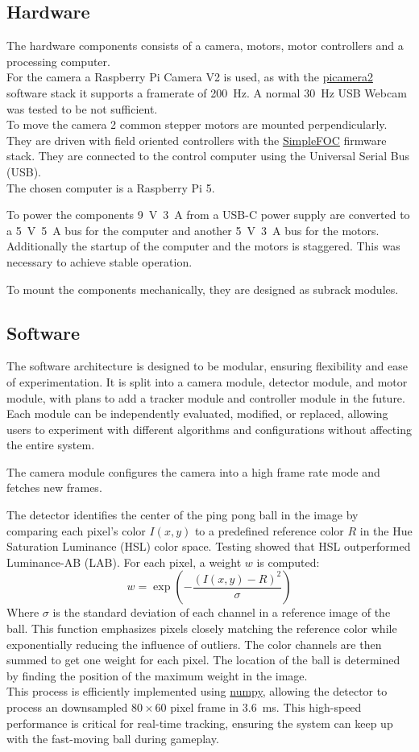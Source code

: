\documentclass[
    parskip=half, 
    twoside=false,
    twocolumn=true,
    fontsize=12pt,
]{scrarticle}
\begin{document}
\subsection*{Hardware}
The hardware components consists of a camera, motors, motor controllers and a processing computer.\\
For the camera a Raspberry Pi Camera V2 is used, as with the \href{https://github.com/raspberrypi/picamera2}{picamera2} software stack it supports a framerate of \SI{200}{Hz}.
A normal \SI{30}{Hz} USB Webcam was tested to be not sufficient.\\
To move the camera 2 common stepper motors are mounted perpendicularly.
They are driven with field oriented controllers with the \href{https://simplefoc.com/}{SimpleFOC} firmware stack.
They are connected to the control computer using the Universal Serial Bus (USB).\\
The chosen computer is a Raspberry Pi 5.

To power the components \SI{9}{V}~\SI{3}{A} from a USB-C power supply are converted to a \SI{5}{V}~\SI{5}{A} bus for the computer and another \SI{5}{V}~\SI{3}{A} bus for the motors.
Additionally the startup of the computer and the motors is staggered.
This was necessary to achieve stable operation.

To mount the components mechanically, they are designed as subrack modules.

\subsection*{Software}
The software architecture is designed to be modular, ensuring flexibility and ease of experimentation. It is split into a camera module, detector module, and motor module, with plans to add a tracker module and controller module in the future. Each module can be independently evaluated, modified, or replaced, allowing users to experiment with different algorithms and configurations without affecting the entire system.

The camera module configures the camera into a high frame rate mode and fetches new frames.

The detector identifies the center of the ping pong ball in the image by comparing each pixel's color $I(x,y)$ to a predefined reference color $R$ in the Hue Saturation Luminance (HSL) color space.
Testing showed that HSL outperformed Luminance-AB (LAB).
For each pixel, a weight $w$ is computed:
$$w = \exp\left(- \frac{(I(x,y)-R)^2}{\sigma}\right)$$
Where $\sigma$ is the standard deviation of each channel in a reference image of the ball.
This function emphasizes pixels closely matching the reference color while exponentially reducing the influence of outliers.
The color channels are then summed to get one weight for each pixel.
The location of the ball is determined by finding the position of the maximum weight in the image.\\
This process is efficiently implemented using \href{https://numpy.org/}{numpy}, allowing the detector to process an downsampled $80\times 60$ pixel frame in \SI{3.6}{ms}.
This high-speed performance is critical for real-time tracking, ensuring the system can keep up with the fast-moving ball during gameplay.
\end{document}
